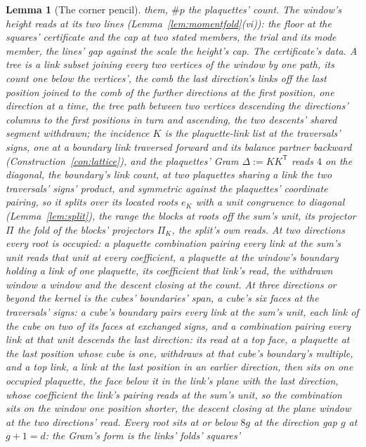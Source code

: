 \documentclass[11pt]{article}
\newtheorem{lemma}{Lemma}
\theoremstyle{definition}
\begin{document}
\begin{lemma}[The corner pencil]
them, $\#p$ the plaquettes' count. The window's height reads at its
two lines (Lemma~\ref{lem:momentfold}(vi)): the floor at the
\emph{squares' certificate} and the cap at two stated members, the
\emph{trial} and its \emph{mode member}, the lines' gap against the
scale the height's cap.
\emph{The certificate's data.} A \emph{tree} is a link subset
joining every two vertices of the window by one path, its count one
below the vertices', the \emph{comb} the last direction's links off
the last position joined to the comb of the further directions at
the first position, one direction at a time, the tree path between
two vertices descending the directions' columns to the first
positions in turn and ascending, the two descents' shared segment
withdrawn; the \emph{incidence} $K$ is the plaquette-link list at
the traversals' signs, one at a boundary link traversed forward and
its balance partner backward (Construction~\ref{con:lattice}), and
the plaquettes' Gram $\Delta:=KK^{\mathsf T}$ reads $4$ on the
diagonal, the boundary's link count, at two plaquettes sharing a
link the two traversals' signs' product, and symmetric against the
plaquettes' coordinate pairing, so it splits over its located roots
$e_K$ with a unit congruence to diagonal (Lemma~\ref{lem:split}),
the \emph{range} the blocks at roots off the sum's unit, its
projector $\Pi$ the fold of the blocks' projectors $\Pi_K$, the
split's own reads. At two directions every root is occupied: a
plaquette combination pairing every link at the sum's unit reads
that unit at every coefficient, a plaquette at the window's boundary
holding a link of one plaquette, its coefficient that link's read,
the withdrawn window a window and the descent closing at the count.
At three directions or beyond the kernel is the \emph{cubes'
boundaries}' span, a cube's six faces at the traversals' signs: a
cube's boundary pairs every link at the sum's unit, each link of the
cube on two of its faces at exchanged signs, and a combination
pairing every link at that unit descends the last direction: its
read at a top face, a plaquette at the last position whose cube is
one, withdraws at that cube's boundary's multiple, and a top link,
a link at the last position in an earlier direction, then sits on
one occupied plaquette, the face below it in the link's plane with
the last direction, whose coefficient the link's pairing reads at
the sum's unit, so the combination sits on the window one position
shorter, the descent closing at the plane window at the two
directions' read. Every root sits at or below $8g$ at the direction
gap $g$ at $g+1=d$: the Gram's form is the links' folds' squares'

\end{lemma}
\end{document}
